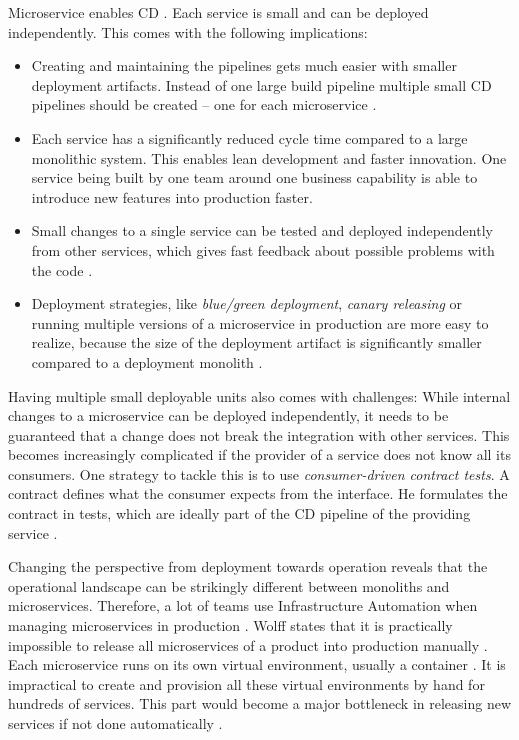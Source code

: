 Microservice enables \acl{CD} \citep[p. 5]{Wolff2016}.
Each service is small and can be deployed independently. 
This comes with the following implications:
\begin{itemize}
\item Creating and maintaining the pipelines gets much easier with smaller deployment artifacts. Instead of one large build pipeline multiple small \ac{CD} pipelines should be created  -- one for each microservice \citep[p. 5]{Wolff2016} .
\item Each service has a significantly reduced cycle time compared to a large monolithic system. This enables lean development and faster innovation. One service being built by one team around one business capability is able to introduce new features into production faster.
\item Small changes to a single service can be tested and deployed independently from other services, which gives fast feedback about possible problems with the code \citep[p. 63]{Wolff2016}. %
\item Deployment strategies, like \textit{blue/green deployment}, \textit{canary releasing} or running multiple versions of a microservice in production are more easy to realize, because the size of the deployment artifact is significantly smaller compared to a deployment monolith \citep[p. 259f.]{Wolff2016}.
\end{itemize}

Having multiple small deployable units also comes with challenges:
While internal changes to a microservice can be deployed independently, it needs to be guaranteed that a change does not break the integration with other services.
This becomes increasingly complicated if the provider of a service does not know all its consumers.
One strategy to tackle this is to use \textit{consumer-driven contract tests}.
A contract defines what the consumer expects from the interface.
He formulates the contract in tests, which are ideally part of the \ac{CD} pipeline of the providing service \citep[p. 233ff.]{Wolff2016}.

Changing the perspective from deployment towards operation reveals that the operational landscape can be strikingly different between monoliths and microservices. 
Therefore, a lot of teams use Infrastructure Automation when managing microservices in production \citep{FowlerInfrastructureAuto2014}.
Wolff states that it is practically impossible to release all microservices of a product into production manually \citep[p. 63f.]{Wolff2016}.
Each microservice runs on its own virtual environment, usually a container \citep[p. 124f.]{Newman2015}.
It is impractical to create and provision all these virtual environments by hand for hundreds of services.
This part would become a major bottleneck in releasing new services if not done automatically \citep[p. 64]{Wolff2016}.

